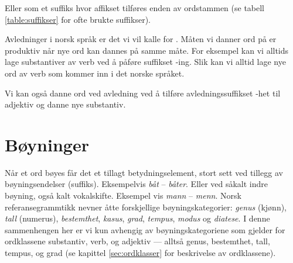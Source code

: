 

Eller som et suffiks hvor affikset tilføres enden av ordstammen (se tabell \ref{table:suffikser} for ofte brukte suffikser).



Avledninger i norsk språk er det vi vil kalle for . Måten vi danner ord på er produktiv når nye ord kan dannes på samme måte. For eksempel kan vi alltids lage substantiver av verb ved å påføre suffikset -ing. Slik kan vi alltid lage nye ord av verb som kommer inn i det norske språket.


Vi kan også danne ord ved avledning ved å tilføre avledningssuffikset -het til adjektiv og danne nye substantiv.


\section{Bøyninger}

Når et ord bøyes får det et tillagt betydningselement, stort sett ved tillegg av bøyningsendelser (suffiks). Eksempelvis \textit{båt} -- \textit{båter}. Eller ved såkalt indre bøyning, også kalt vokalskifte. Eksempel vis \textit{mann} -- \textit{menn}. Norsk referansegrammtikk\cite{faarlund1997norsk} nevner åtte forskjellige bøyningskategorier: \textit{genus} (kjønn), \textit{tall} (numerus), \textit{bestemthet}, \textit{kasus}, \textit{grad}, \textit{tempus}, \textit{modus} og \textit{diatese}. I denne sammenhengen her er vi kun avhengig av bøyningskategoriene som gjelder for ordklassene substantiv, verb, og adjektiv --- alltså genus, bestemthet, tall, tempus, og grad (se kapittel \ref{sec:ordklasser} for beskrivelse av ordklassene).


